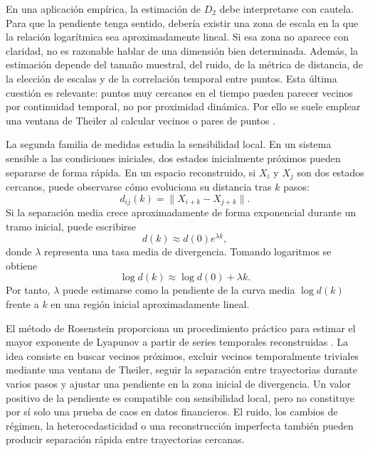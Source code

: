 En una aplicación empírica, la estimación de \(D_2\) debe interpretarse con cautela. Para que la pendiente tenga sentido, debería existir una zona de escala en la que la relación logarítmica sea aproximadamente lineal. Si esa zona no aparece con claridad, no es razonable hablar de una dimensión bien determinada. Además, la estimación depende del tamaño muestral, del ruido, de la métrica de distancia, de la elección de escalas y de la correlación temporal entre puntos. Esta última cuestión es relevante: puntos muy cercanos en el tiempo pueden parecer vecinos por continuidad temporal, no por proximidad dinámica. Por ello se suele emplear una ventana de Theiler al calcular vecinos o pares de puntos \cite{theiler1986}.

La segunda familia de medidas estudia la sensibilidad local. En un sistema sensible a las condiciones iniciales, dos estados inicialmente próximos pueden separarse de forma rápida. En un espacio reconstruido, si \(X_i\) y \(X_j\) son dos estados cercanos, puede observarse cómo evoluciona su distancia tras \(k\) pasos:
\begin{equation}
    d_{ij}(k)=\|X_{i+k}-X_{j+k}\|.
\end{equation}
Si la separación media crece aproximadamente de forma exponencial durante un tramo inicial, puede escribirse
\begin{equation}
    d(k)\approx d(0)e^{\lambda k},
\end{equation}
donde \(\lambda\) representa una tasa media de divergencia. Tomando logaritmos se obtiene
\begin{equation}
    \log d(k) \approx \log d(0) + \lambda k.
\end{equation}
Por tanto, \(\lambda\) puede estimarse como la pendiente de la curva media \(\log d(k)\) frente a \(k\) en una región inicial aproximadamente lineal.

El método de Rosenstein proporciona un procedimiento práctico para estimar el mayor exponente de Lyapunov a partir de series temporales reconstruidas \cite{rosenstein1993}. La idea consiste en buscar vecinos próximos, excluir vecinos temporalmente triviales mediante una ventana de Theiler, seguir la separación entre trayectorias durante varios pasos y ajustar una pendiente en la zona inicial de divergencia. Un valor positivo de la pendiente es compatible con sensibilidad local, pero no constituye por sí solo una prueba de caos en datos financieros. El ruido, los cambios de régimen, la heterocedasticidad o una reconstrucción imperfecta también pueden producir separación rápida entre trayectorias cercanas.

